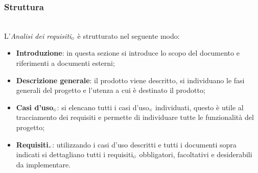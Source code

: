 \subsubsection{Struttura}\label{ProcessiPrimariProspettiveAnalisiDeiRequisitiStruttura}\mbox{}\\ %
L'\textit{Analisi dei requisiti$_{\scaleto{G}{3pt}}$} è strutturato nel seguente modo:
\begin{itemize}
	\item \textbf{Introduzione}: in questa sezione si introduce lo scopo del documento e riferimenti a documenti esterni;
	\item \textbf{Descrizione generale}: il prodotto viene descritto, si individuano le fasi generali del progetto e l'utenza a cui è destinato il prodotto;
	\item \textbf{Casi d'uso$_{\scaleto{G}{3pt}}$}: si elencano tutti i casi d'uso$_{\scaleto{G}{3pt}}$ individuati, questo è utile al tracciamento dei requisiti e permette di individuare tutte le funzionalità del progetto;
	\item \textbf{Requisiti$_{\scaleto{G}{3pt}}$}: utilizzando i casi d'uso descritti e tutti i documenti sopra indicati si dettagliano tutti i requisiti$_{\scaleto{G}{3pt}}$ obbligatori, facoltativi e desiderabili da implementare.
\end{itemize}

